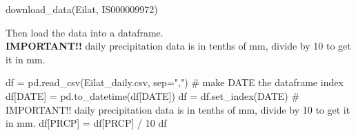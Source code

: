 \documentclass[
  letterpaper,
  DIV=11,
  numbers=noendperiod]{scrreprt}
\newenvironment{Shaded}{\begin{snugshade}}{\end{snugshade}}
\newcommand{\CommentTok}[1]{\textcolor[rgb]{0.37,0.37,0.37}{#1}}
\newcommand{\DecValTok}[1]{\textcolor[rgb]{0.68,0.00,0.00}{#1}}
\newcommand{\NormalTok}[1]{\textcolor[rgb]{0.00,0.23,0.31}{#1}}
\newcommand{\OperatorTok}[1]{\textcolor[rgb]{0.37,0.37,0.37}{#1}}
\newcommand{\StringTok}[1]{\textcolor[rgb]{0.13,0.47,0.30}{#1}}
\begin{document}
\begin{Shaded}
\begin{Highlighting}[]
\NormalTok{download\_data(}\StringTok{\textquotesingle{}Eilat\textquotesingle{}}\NormalTok{, }\StringTok{\textquotesingle{}IS000009972\textquotesingle{}}\NormalTok{)}
\end{Highlighting}
\end{Shaded}

Then load the data into a dataframe.\\
\textbf{IMPORTANT!!} daily precipitation data is in tenths of mm, divide
by 10 to get it in mm.

\begin{Shaded}
\begin{Highlighting}[]
\NormalTok{df }\OperatorTok{=}\NormalTok{ pd.read\_csv(}\StringTok{\textquotesingle{}Eilat\_daily.csv\textquotesingle{}}\NormalTok{, sep}\OperatorTok{=}\StringTok{","}\NormalTok{)}
\CommentTok{\# make \textquotesingle{}DATE\textquotesingle{} the dataframe index}
\NormalTok{df[}\StringTok{\textquotesingle{}DATE\textquotesingle{}}\NormalTok{] }\OperatorTok{=}\NormalTok{ pd.to\_datetime(df[}\StringTok{\textquotesingle{}DATE\textquotesingle{}}\NormalTok{])}
\NormalTok{df }\OperatorTok{=}\NormalTok{ df.set\_index(}\StringTok{\textquotesingle{}DATE\textquotesingle{}}\NormalTok{)}
\CommentTok{\# IMPORTANT!! daily precipitation data is in tenths of mm, divide by 10 to get it in mm.}
\NormalTok{df[}\StringTok{\textquotesingle{}PRCP\textquotesingle{}}\NormalTok{] }\OperatorTok{=}\NormalTok{ df[}\StringTok{\textquotesingle{}PRCP\textquotesingle{}}\NormalTok{] }\OperatorTok{/} \DecValTok{10}
\NormalTok{df}
\end{Highlighting}
\end{Shaded}
\end{document}
